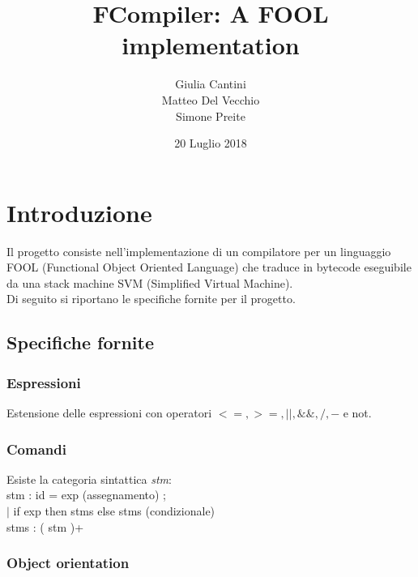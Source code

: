 \documentclass[a4paper]{article}   %
\begin{document}
\title{FCompiler: A FOOL implementation}
\author{Giulia Cantini\\
        Matteo Del Vecchio\\
        Simone Preite}
\date{20 Luglio 2018}    %
\maketitle

\tableofcontents

\section{Introduzione}

Il progetto consiste nell'implementazione di un compilatore per un linguaggio FOOL (Functional Object Oriented Language) che traduce in bytecode
eseguibile da una stack machine SVM (Simplified Virtual Machine).\\

Di seguito si riportano le specifiche fornite per il progetto.

\subsection{Specifiche fornite}

\subsubsection{Espressioni}

Estensione delle espressioni con operatori $<=, >=, ||, \&\&, /, - $
   e not.

\subsubsection{Comandi}

Esiste la categoria sintattica \textit{stm}:\\

stm : 	id = exp (assegnamento) ; \\
	$|$ if exp then { stms } else { stms } (condizionale)\\

stms :  ( stm )+

\subsubsection{Object orientation}
\end{document}
